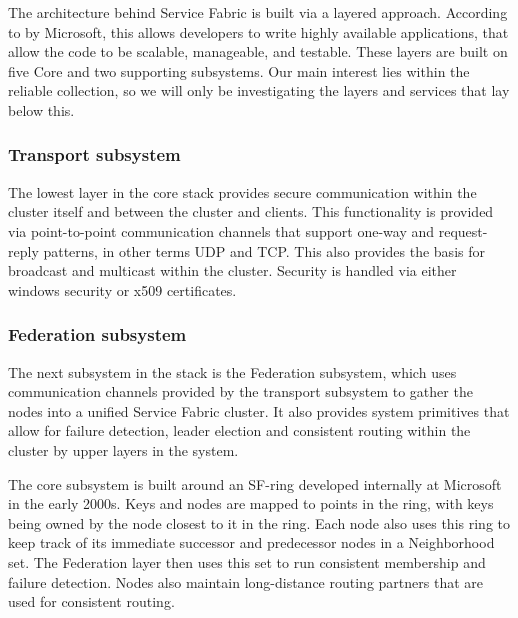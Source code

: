 \documentclass[a4paper,10pt,titlepage]{report}
\begin{document}
    The architecture behind Service Fabric is built via a layered approach. According to by Microsoft, this allows developers to write highly available applications, that allow the code to be scalable, manageable, and testable. These layers are built on five Core and two supporting subsystems. Our main interest lies within the reliable collection, so we will only be investigating the layers and services that lay below this.\\
    \vspace{5mm}

    \subsubsection{Transport subsystem}
    The lowest layer in the core stack provides secure communication within the cluster itself and between the cluster and clients. This functionality is provided via point-to-point communication channels that support one-way and request-reply patterns, in other terms UDP and TCP. This also provides the basis for broadcast and multicast within the cluster. Security is handled via either windows security or x509 certificates. \\
    \vspace{5mm}

    \subsubsection{Federation subsystem}

    The next subsystem in the stack is the Federation subsystem, which uses communication channels provided by the transport subsystem to gather the nodes into a unified Service Fabric cluster. It also provides system primitives that allow for failure detection, leader election and consistent routing within the cluster by upper layers in the system.\\
    \vspace{5mm}

    The core subsystem is built around an SF-ring developed internally at Microsoft in the early 2000s. Keys and nodes are mapped to points in the ring, with keys being owned by the node closest to it in the ring. Each node also uses this ring to keep track of its immediate successor and predecessor nodes in a Neighborhood set. The Federation layer then uses this set to run consistent membership and failure detection. Nodes also maintain long-distance routing partners that are used for consistent routing.\\
    \vspace{5mm}
\end{document}

